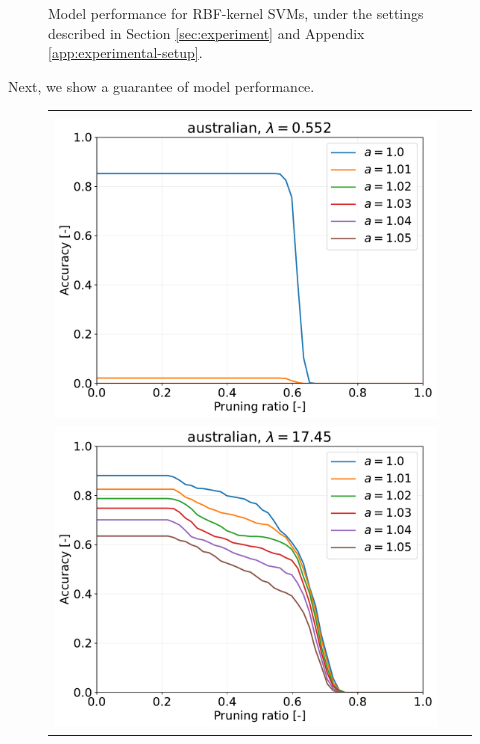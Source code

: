 \begin{figure}[H]
\begin{tabular}{ccc}
\end{tabular}
\caption{Model performance for RBF-kernel SVMs, under the settings described in Section \ref{sec:experiment} and Appendix \ref{app:experimental-setup}.}
\label{fig:result-acc-svm}
\end{figure}

Next, we show a guarantee of model performance.


\begin{figure}[H]
	\begin{tabular}{ccc}
		\begin{minipage}[b]{0.3\hsize}\centering {\small Dataset: australian, $\lambda=n \cdot 10^{-3}$}\\\includegraphics[width=0.8\hsize]{fig/australian/kernel_ss_screening_rate_lam0.552_x_n_y_etest.pdf}\end{minipage}
		&
		\begin{minipage}[b]{0.3\hsize}\centering {\small Dataset: australian, $\lambda=n \cdot 10^{-1.5}$}\\\includegraphics[width=0.8\hsize]{fig/australian/kernel_ss_screening_rate_lam17.45_x_n_y_etest.pdf}\end{minipage}

\end{tabular}
\end{figure}
